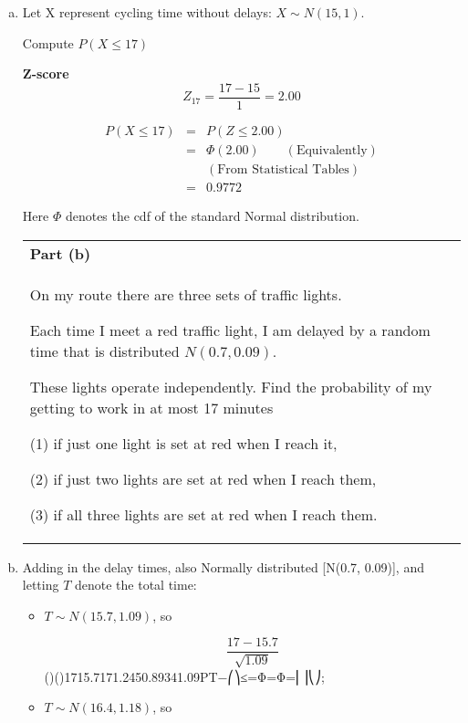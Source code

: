 \documentclass[a4paper,12pt]{article}
\begin{document}
\begin{enumerate}[(a)]
\item 

Let X represent cycling time without delays: $X \sim N(15, 1)$.

Compute $P(X \leq 17)$
\begin{framed}
\noindent \textbf{Z-score}
\[Z_{17} = \frac{17-15}{1}= 2.00\]
\end{framed}
\begin{eqnarray*} 
P(X \leq 17)  &=& P(Z \leq 2.00) \\
 &=& \Phi(2.00) \qquad (\mbox{Equivalently})\\
 & & (\mbox{From Statistical Tables}) \\
 &=& 0.9772
\end{eqnarray*} 

Here $\Phi$ denotes the cdf of the standard Normal distribution.

\newpage
\begin{table}[ht!]
     \centering
     \begin{tabular}{|p{15cm}|}
     \hline        
\noindent \textbf{Part (b)}\\ On my route there are three sets of traffic lights.

Each time I meet a red traffic light, I am delayed by a random time that is distributed $N(0.7, 0.09)$. 

These lights operate independently. Find the probability of my getting to work in at most 17 minutes

(1) if just one light is set at red when I reach it,

(2) if just two lights are set at red when I reach them,

(3) if all three lights are set at red when I reach them.

\\ \hline
      \end{tabular}
    \end{table}
    



\item  Adding in the delay times, also Normally distributed [N(0.7, 0.09)], and letting $T$ denote the total time:
\begin{itemize}
\item $T \sim N(15.7, 1.09)$, so

\[\frac{17 - 15.7}{\sqrt{1.09}}\]
()()1715.7171.2450.89341.09PT−⎛⎞≤=Φ=Φ=⎜⎟⎝⎠;
\item $T \sim N(16.4, 1.18)$, so




\end{itemize}
\end{enumerate}
\end{document}
